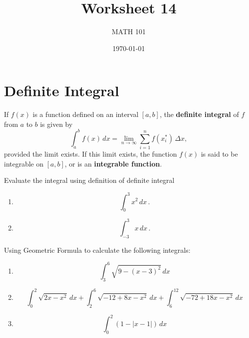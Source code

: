 \documentclass[12pt]{amsart}
\title{ Worksheet 14}
\author{MATH 101}
\date{\today}
\begin{document}
\maketitle


\section*{Definite Integral}


\begin{definition}
	If \( f(x) \) is a function defined on an interval \([a, b]\), the \textbf{definite integral} of \( f \) from \( a \) to \( b \) is given by
	\[
		\int_a^b f(x) \, dx = \lim_{n \to \infty} \sum_{i=1}^n f(x_i^*) \, \Delta x,
	\]
	provided the limit exists. If this limit exists, the function \( f(x) \) is said to be integrable on \([a, b]\), or is an \textbf{integrable function}.
\end{definition}

\begin{problem}
Evaluate the integral using definition of definite integral
\begin{enumerate}
	\item \begin{equation*}
		      \int_0^3 x^2 \, dx \,.
	      \end{equation*}
	      \newpage
	\item \begin{equation*}
		      \int_{-3}^3 x \, dx \,.
	      \end{equation*}
	      \vspace{8cm}
\end{enumerate}
\end{problem}

\begin{problem}
Using Geometric Formula to calculate the following integrals:
\begin{enumerate}
	\item $$ \int_3^6 \sqrt{ 9 - (x-3)^2} \, dx$$
	      \vspace{5cm}
	\item $$ \int_0^2 \sqrt{2x - x^2} \, dx + \int_2^6 \sqrt{ -12 + 8x - x^2} \, dx + \int_6^{12} \sqrt{-72 + 18x -x^2} \, dx$$
	      \vspace{5cm}
	\item $$ \int_0^2 \left( 1 - | x -1 | \right) \, dx$$
	      \vspace{5cm}
\end{enumerate}
\end{problem}
\end{document}
